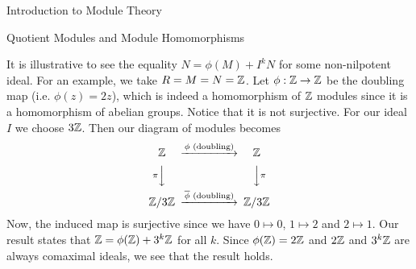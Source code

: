\begin{chapter}{Introduction to Module Theory}
\begin{section}{Quotient Modules and Module Homomorphisms}
\begin{solution}
It is illustrative to see the equality $N = \phi(M) + I^kN$ for some non-nilpotent ideal. For an example, we take $R = M = N = \mathbb{Z}$. Let $\phi:\mathbb{Z}\to\mathbb{Z}$ be the doubling map (i.e. $\phi(z) = 2z$), which is indeed a homomorphism of $\mathbb{Z}$ modules since it is a homomorphism of abelian groups. Notice that it is not surjective. For our ideal $I$ we choose  $3\mathbb{Z}$. Then our diagram of modules becomes \[
\begin{CD}
\Z @>\text{$\phi$ (doubling)}>> \Z\\
@V\pi VV @VV\pi V\\
\Z/3\Z @>\text{$\overline{\phi}$ (doubling)}>> \Z/3\Z
\end{CD}
\]
Now, the induced map is surjective since we have $0\mapsto 0$, $1\mapsto 2$ and $2\mapsto 1$. Our result states that $\mathbb{Z} = \phi(\mathbb{Z}) + 3^k\mathbb{Z}$ for all $k$. Since $\phi(\mathbb{Z}) = 2\mathbb{Z}$ and $2\mathbb{Z}$ and $3^k\mathbb{Z}$ are always comaximal ideals, we see that the result holds. 


\end{solution}\oneperpage




\end{section}
\end{chapter}
